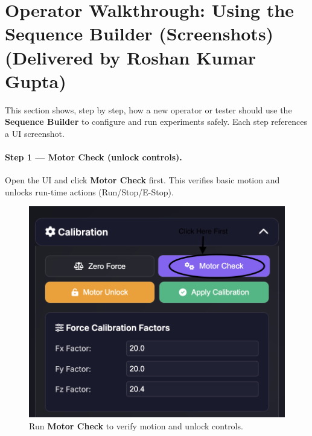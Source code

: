 \documentclass[
    twocolumn,
    fontsize = 10pt,
    parskip = half+,
    headings = small,
    headwidth = text,
    footwidth = text,
]{scrartcl}
\begin{document}

\section{Operator Walkthrough: Using the Sequence Builder (Screenshots) \textnormal{(Delivered by Roshan Kumar Gupta)}}
\label{sec:sb-walkthrough}

This section shows, step by step, how a new operator or tester should use the \textbf{Sequence Builder} to configure and run experiments safely. Each step references a UI screenshot.

\paragraph{\textbf{Step 1 — Motor Check (unlock controls).}}
Open the UI and click \textbf{Motor Check} first. This verifies basic motion and unlocks run-time actions (Run/Stop/E-Stop).
\begin{figure}[htbp]\centering
  \includegraphics[width=.9\linewidth]{pics/motor-check.png}
  \caption{Run \textbf{Motor Check} to verify motion and unlock controls.}
  \label{fig:sb-motor-check}
\end{figure}
\end{document}
